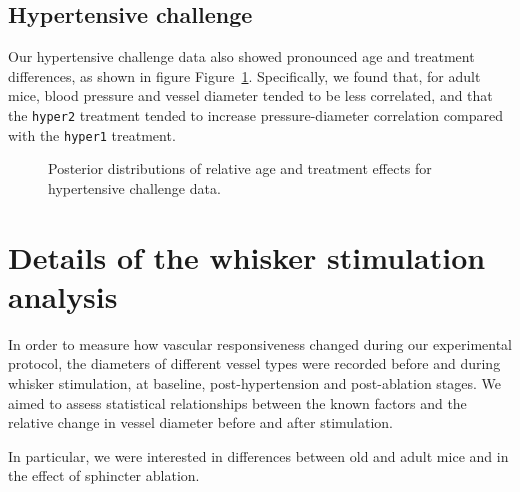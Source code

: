 \documentclass[
  letterpaper,
  DIV=11,
  numbers=noendperiod,
  oneside]{scrartcl}
\theoremstyle{plain}
\theoremstyle{remark}
\begin{document}
\subsection{Hypertensive challenge}\label{hypertensive-challenge}

Our hypertensive challenge data also showed pronounced age and treatment
differences, as shown in figure Figure~\ref{fig-hypertension-effects}.
Specifically, we found that, for adult mice, blood pressure and vessel
diameter tended to be less correlated, and that the \texttt{hyper2}
treatment tended to increase pressure-diameter correlation compared with
the \texttt{hyper1} treatment.

\begin{figure}


\caption{\label{fig-hypertension-effects}Posterior distributions of
relative age and treatment effects for hypertensive challenge data.}

\end{figure}%

\section{Details of the whisker stimulation
analysis}\label{details-of-the-whisker-stimulation-analysis}

In order to measure how vascular responsiveness changed during our
experimental protocol, the diameters of different vessel types were
recorded before and during whisker stimulation, at baseline,
post-hypertension and post-ablation stages. We aimed to assess
statistical relationships between the known factors and the relative
change in vessel diameter before and after stimulation.

In particular, we were interested in differences between old and adult
mice and in the effect of sphincter ablation.
\end{document}

